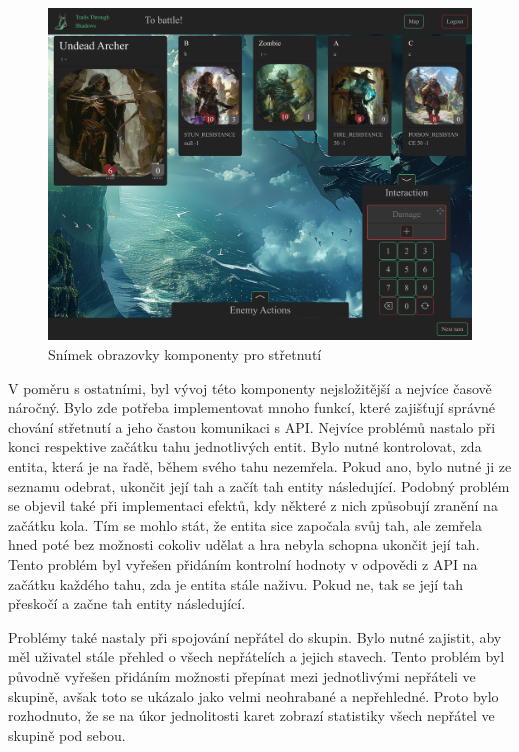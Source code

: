 \begin{figure}[H]
  \centering
  \includegraphics[width=.95\textwidth]{resources/figures/TTS-Encounter.png}
  \caption{Snímek obrazovky komponenty pro střetnutí}
  \label{fig:combat}
\end{figure}

V poměru s ostatními, byl vývoj této komponenty nejsložitější a nejvíce časově náročný. Bylo zde potřeba implementovat mnoho funkcí, které zajišťují správné chování střetnutí a jeho častou komunikaci s API. Nejvíce problémů nastalo při konci respektive začátku tahu jednotlivých entit. Bylo nutné kontrolovat, zda entita, která je na řadě, během svého tahu nezemřela. Pokud ano, bylo nutné ji ze seznamu odebrat, ukončit její tah a začít tah entity následující. Podobný problém se objevil také při implementaci efektů, kdy některé z nich způsobují zranění na začátku kola. Tím se mohlo stát, že entita sice započala svůj tah, ale zemřela hned poté bez možnosti cokoliv udělat a hra nebyla schopna ukončit její tah. Tento problém byl vyřešen přidáním kontrolní hodnoty v odpovědi z API na začátku každého tahu, zda je entita stále naživu. Pokud ne, tak se její tah přeskočí a začne tah entity následující.

Problémy také nastaly při spojování nepřátel do skupin. Bylo nutné zajistit, aby měl uživatel stále přehled o všech nepřátelích a jejich stavech. Tento problém byl původně vyřešen přidáním možnosti přepínat mezi jednotlivými nepřáteli ve skupině, avšak toto se ukázalo jako velmi neohrabané a nepřehledné. Proto bylo rozhodnuto, že se na úkor jednolitosti karet zobrazí statistiky všech nepřátel ve skupině pod sebou.

